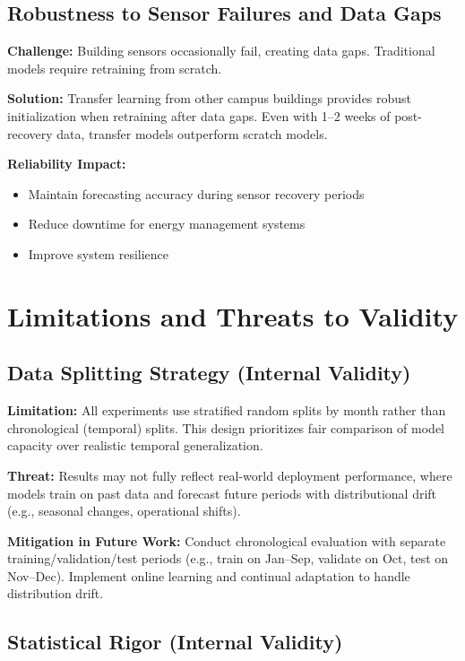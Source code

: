 \documentclass[12pt,a4paper]{report}
\begin{document}
\subsection{Robustness to Sensor Failures and Data Gaps}

\textbf{Challenge:} Building sensors occasionally fail, creating data gaps. Traditional models require retraining from scratch.

\textbf{Solution:} Transfer learning from other campus buildings provides robust initialization when retraining after data gaps. Even with 1--2 weeks of post-recovery data, transfer models outperform scratch models.

\textbf{Reliability Impact:}
\begin{itemize}
    \item Maintain forecasting accuracy during sensor recovery periods
    \item Reduce downtime for energy management systems
    \item Improve system resilience
\end{itemize}

\section{Limitations and Threats to Validity}

\subsection{Data Splitting Strategy (Internal Validity)}

\textbf{Limitation:} All experiments use stratified random splits by month rather than chronological (temporal) splits. This design prioritizes fair comparison of model capacity over realistic temporal generalization.

\textbf{Threat:} Results may not fully reflect real-world deployment performance, where models train on past data and forecast future periods with distributional drift (e.g., seasonal changes, operational shifts).

\textbf{Mitigation in Future Work:} Conduct chronological evaluation with separate training/validation/test periods (e.g., train on Jan--Sep, validate on Oct, test on Nov--Dec). Implement online learning and continual adaptation to handle distribution drift.

\subsection{Statistical Rigor (Internal Validity)}
\end{document}
